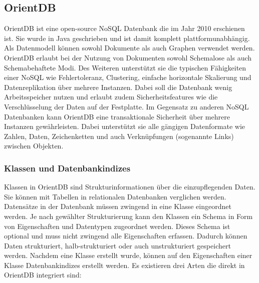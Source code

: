 \subsection{OrientDB}


OrientDB ist eine open-source NoSQL Datenbank die im Jahr 2010 erschienen ist. Sie wurde in Java geschrieben und ist damit komplett plattformunabhängig. Als Datenmodell können sowohl Dokumente als auch Graphen verwendet werden. OrientDB erlaubt bei der Nutzung von Dokumenten sowohl Schemalose als auch Schemabehaftete Modi. Des Weiteren unterstützt sie die typischen Fähigkeiten einer NoSQL wie Fehlertoleranz, Clustering, einfache horizontale Skalierung und Datenreplikation über mehrere Instanzen. Dabei soll die Datenbank wenig Arbeitsspeicher nutzen und erlaubt zudem Sicherheitsfeatures wie die Verschlüsselung der Daten auf der Festplatte. Im Gegensatz zu anderen NoSQL Datenbanken kann OrientDB eine transaktionale Sicherheit über mehrere Instanzen gewährleisten. Dabei unterstützt sie alle gängigen Datenformate wie Zahlen, Daten, Zeichenketten und auch Verknüpfungen (sogenannte Links) zwischen Objekten.

\subsubsection{Klassen und Datenbankindizes}

Klassen in OrientDB sind Strukturinformationen über die einzupflegenden Daten. Sie können mit Tabellen in relationalen Datenbanken verglichen werden. Datensätze in der Datenbank müssen zwingend in eine Klasse eingeordnet werden. Je nach gewählter Strukturierung kann den Klassen ein Schema in Form von Eigenschaften und Datentypen zugeordnet werden. Dieses Schema ist optional und muss nicht zwingend alle Eigenschaften erfassen. Dadurch können Daten strukturiert, halb-strukturiert oder auch unstrukturiert gespeichert werden. Nachdem eine Klasse erstellt wurde, können auf den Eigenschaften einer Klasse Datenbankindizes erstellt werden. Es existieren drei Arten die direkt in OrientDB integriert sind:

